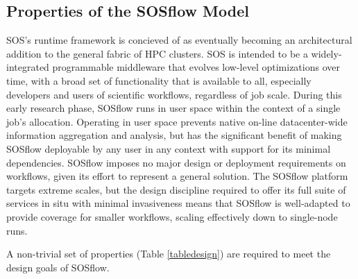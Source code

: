 
\subsection{Properties of the SOSflow Model}

SOS's runtime framework is concieved of as eventually becoming an
architectural addition to the general fabric of HPC clusters.
%
SOS is intended to be a widely-integrated programmable middleware that
evolves low-level optimizations over time, with a broad set of
functionality that is available to all, especially developers and
users of scientific workflows, regardless of job scale.
%
During this early research phase, SOSflow runs in user space within
the context of a single job's allocation.
%
Operating in user space prevents native on-line datacenter-wide
information aggregation and analysis, but has the significant benefit
of making SOSflow deployable by any user in any context with support for its
minimal dependencies.
%
SOSflow imposes no major design or deployment requirements on workflows,
given its effort to represent a general solution.
%
The SOSflow platform targets extreme scales, but the design discipline
required to offer its full suite of services in situ with minimal
invasiveness means that SOSflow is well-adapted to provide coverage
for smaller workflows, scaling effectively down to single-node runs.

A non-trivial set of properties (Table \ref{tabledesign}) are required
to meet the design goals of SOSflow.
%

%



%
%
%


